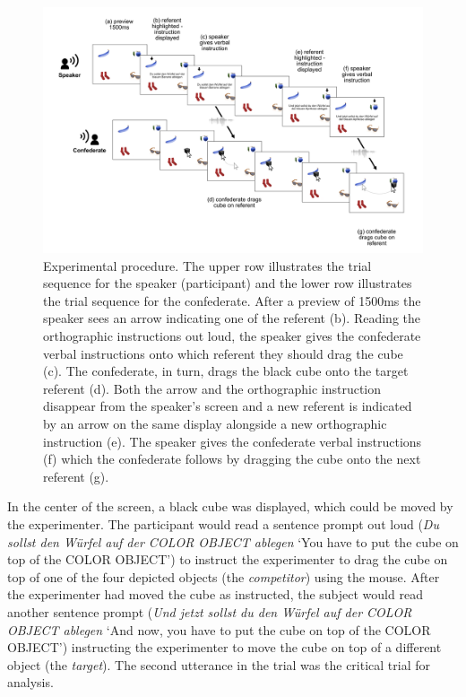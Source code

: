 \documentclass[Review,times,sageh]{sagej}
\begin{document}
\begin{figure}
\includegraphics[width=1\linewidth]{../figs/procedure_plot} \caption{Experimental procedure. The upper row illustrates the trial sequence for the speaker (participant) and the lower row illustrates the trial sequence for the confederate. After a preview of 1500ms the speaker sees an arrow indicating one of the referent (b). Reading the orthographic instructions out loud, the speaker gives the confederate verbal instructions onto which referent they should drag the cube (c). The confederate, in turn, drags the black cube onto the target referent (d). Both the arrow and the orthographic instruction disappear from the speaker's screen and a new referent is indicated by an arrow on the same display alongside a new orthographic instruction (e). The speaker gives the confederate verbal instructions (f) which the confederate follows by dragging the cube onto the next referent (g).}\label{fig:procedural}
\end{figure}

In the center of the screen, a black cube was displayed, which could be moved by the experimenter.
The participant would read a sentence prompt out loud (\emph{Du sollst den Würfel auf der COLOR OBJECT ablegen} `You have to put the cube on top of the COLOR OBJECT') to instruct the experimenter to drag the cube on top of one of the four depicted objects (the \emph{competitor}) using the mouse.
After the experimenter had moved the cube as instructed, the subject would read another sentence prompt (\emph{Und jetzt sollst du den Würfel auf der COLOR OBJECT ablegen} `And now, you have to put the cube on top of the COLOR OBJECT') instructing the experimenter to move the cube on top of a different object (the \emph{target}).
The second utterance in the trial was the critical trial for analysis.
\end{document}
